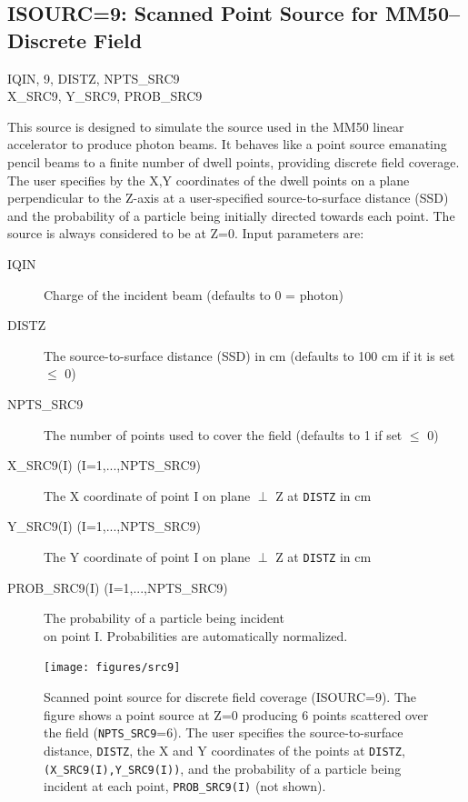 \documentclass[12pt,twoside]{article}
\newcommand{\cen}[1]{\begin{center} #1 \end{center}                   }
\begin{document}
\clearpage

\subsection[ISOURC=9: Scanned Point Source for MM50--Discrete]{ISOURC=9: Scanned Point Source for MM50--Discrete Field}
\cen{IQIN, 9, DISTZ, NPTS\_SRC9 \\
X\_SRC9, Y\_SRC9, PROB\_SRC9}

This source is designed to simulate the source used in the MM50 linear
accelerator to produce photon beams.  It behaves like a point source emanating
pencil beams to a finite number of dwell points, providing
discrete field coverage.  The user specifies by the X,Y coordinates
of the dwell points on a plane perpendicular to the Z-axis at
a user-specified source-to-surface distance (SSD) and the
probability of a particle being initially directed towards each point.
The source is always considered to be at Z=0.
Input parameters are:
\begin{description}
\item [IQIN] Charge of the incident beam (defaults to 0 = photon)
\item [DISTZ] The source-to-surface distance (SSD) in cm
(defaults to 100 cm if it is set $\leq$ 0)
\item [NPTS\_SRC9] The number of points used to cover the
field (defaults to 1 if set $\leq$ 0)
\item [X\_SRC9(I) (I=1,...,NPTS\_SRC9)] The X coordinate of
point I on plane $\perp$ Z at \verb+DISTZ+ in cm
\item [Y\_SRC9(I) (I=1,...,NPTS\_SRC9)] The Y coordinate of
point I on plane $\perp$ Z at \verb+DISTZ+ in cm
\item [PROB\_SRC9(I) (I=1,...,NPTS\_SRC9)] The probability of a particle
being incident\\ on point I.  Probabilities are automatically
normalized.
\end{description}
\begin{figure}[htbp]
\begin{center}
\leavevmode
\mbox{}\hspace{0cm}
\texttt{[image: figures/src9]}
\caption[ISOURC=9: Discrete beams from point source.]
{Scanned point source for discrete field coverage (ISOURC=9).
The figure shows a point source at Z=0 producing 6 points scattered over
the field ({\tt NPTS\_SRC9}=6).  The user specifies the source-to-surface
distance, {\tt DISTZ}, the X and Y coordinates of the points at {\tt DISTZ},
{\tt (X\_SRC9(I),Y\_SRC9(I))}, and the probability of a particle being
incident at each point, {\tt PROB\_SRC9(I)} (not shown).  }
\label{fig_src9}
\end{center}
\end{figure}
\end{document}
